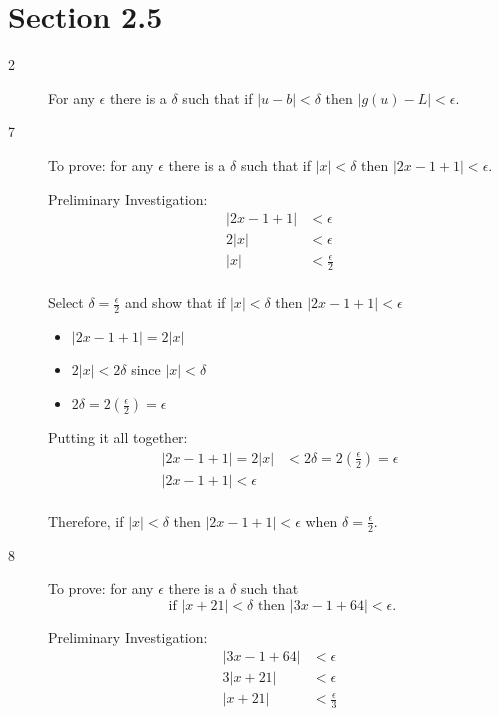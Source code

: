 \documentclass{exam}
\begin{document}
\section{Section 2.5}
\begin{description}

\item[2]

For any $\epsilon$ there is a $\delta$ such that if $|u - b| < \delta$ then $|g(u) - L| < \epsilon$.

\item[7]
To prove: for any $\epsilon$ there is a $\delta$ such that if $|x| < \delta$ then $|2x - 1 + 1| < \epsilon$.

Preliminary Investigation:
\begin{align*}
  |2x - 1 + 1| &< \epsilon \\
  2|x| &< \epsilon \\
  |x| &< \frac{\epsilon}{2} \\
\end{align*}

Select $\delta = \frac{\epsilon}{2}$ and show that if $|x| < \delta$ then $|2x - 1 + 1| < \epsilon$

\begin{itemize}
  \item $|2x - 1 + 1| = 2|x|$
  \item $2|x| < 2 \delta$ since $|x| < \delta$
  \item $2 \delta = 2 \left( \frac{\epsilon}{2} \right) = \epsilon$
\end{itemize}

Putting it all together:
\begin{align*}
  |2x - 1 + 1| = 2|x| &< 2 \delta = 2 \left( \frac{\epsilon}{2} \right) = \epsilon \\
  |2x - 1 + 1| < \epsilon \\
\end{align*}

Therefore, if $|x| < \delta$ then $|2x - 1 + 1| < \epsilon$ when $\delta = \frac{\epsilon}{2}$.

\item[8]
To prove: for any $\epsilon$ there is a $\delta$ such that 
\[
  \text{ if } |x + 21| < \delta \text{ then } |3x - 1 + 64| < \epsilon.
\]

Preliminary Investigation:
\begin{align*}
  |3x - 1 + 64| &< \epsilon \\
  3|x + 21| &< \epsilon \\
  |x + 21| &< \frac{\epsilon}{3} \\
\end{align*}


\end{description}
\end{document}
